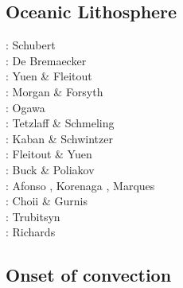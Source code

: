 \subsection{Oceanic Lithosphere}

\begin{scriptsize}
\nineteenseventysix: Schubert \etal \cite{scfy76}\\
\nineteenseventyseven: De Bremaecker \cite{debr77}\\
\nineteeneightyfour: Yuen \& Fleitout \cite{yufl84}\\
\nineteeneightyeight: Morgan \& Forsyth \cite{mofo88}\\
\nineteenninety: Ogawa \cite{ogaw90} \\
\twothousand: Tetzlaff \& Schmeling \cite{tesc00}\\
\twothousandone: Kaban \& Schwintzer \cite{kasc01}\\
\nineteeneightyfour: Fleitout \& Yuen \cite{flyu84} \\
\nineteenninetyeight: Buck \& Poliakov \cite{bupo98}\\
\twothousandseven: Afonso \etal \cite{afrf07}, Korenaga \cite{kore07}, Marques \etal \cite{macl07}\\
\twothousandeight: Choii \& Gurnis \cite{chgu08}\\
\twothousandtwelve: Trubitsyn \cite{trub12} \\
\twothousandeighteen: Richards \etal \cite{rihc18}
\end{scriptsize}

\subsection{Onset of convection}

